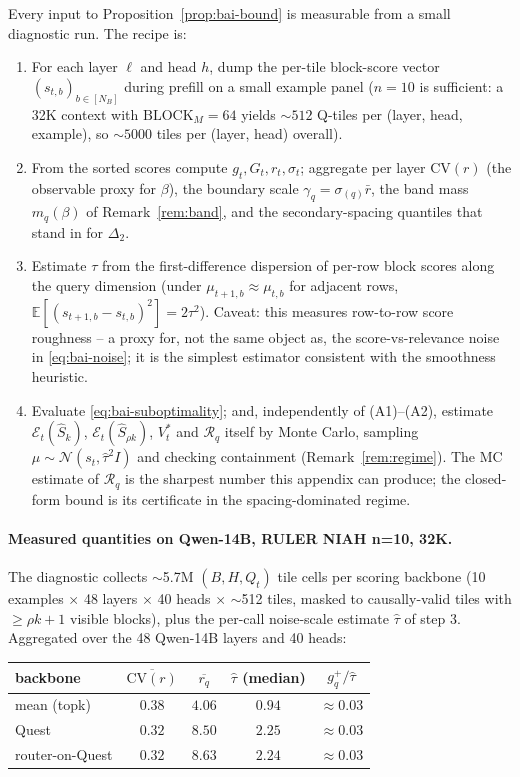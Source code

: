 \documentclass[11pt]{article}
\theoremstyle{remark}
\newcommand{\NB}{N_{\!B}}
\newcommand{\BlockM}{\text{BLOCK}_M}
\begin{document}
Every input to Proposition~\ref{prop:bai-bound} is measurable from a small diagnostic run. The recipe is:
\begin{enumerate}[leftmargin=*,topsep=0.2em,itemsep=0.1em]
    \item For each layer $\ell$ and head $h$, dump the per-tile block-score vector $(s_{t,b})_{b \in [\NB]}$ during prefill on a small example panel ($n=10$ is sufficient: a 32K context with $\BlockM = 64$ yields $\sim 512$ Q-tiles per (layer, head, example), so $\sim 5000$ tiles per (layer, head) overall).
    \item From the sorted scores compute $g_t, G_t, r_t, \sigma_t$; aggregate per layer $\mathrm{CV}(r)$ (the observable proxy for $\beta$), the boundary scale $\gamma_q = \sigma_{(q)} \bar r$, the band mass $m_q(\beta)$ of Remark~\ref{rem:band}, and the secondary-spacing quantiles that stand in for $\Delta_2$.
    \item Estimate $\tau$ from the first-difference dispersion of per-row block scores along the query dimension (under $\mu_{t+1,b} \approx \mu_{t,b}$ for adjacent rows, $\mathbb E[(s_{t+1,b} - s_{t,b})^2] = 2\tau^2$). Caveat: this measures row-to-row score roughness -- a proxy for, not the same object as, the score-vs-relevance noise in \eqref{eq:bai-noise}; it is the simplest estimator consistent with the smoothness heuristic.
    \item Evaluate \eqref{eq:bai-suboptimality}; and, independently of (A1)--(A2), estimate $\mathcal E_t(\widehat S_k)$, $\mathcal E_t(\widehat S_{\rho k})$, $V^*_t$ and $\mathcal R_q$ itself by Monte Carlo, sampling $\mu \sim \mathcal N(s_t, \hat\tau^2 I)$ and checking containment (Remark~\ref{rem:regime}). The MC estimate of $\mathcal R_q$ is the sharpest number this appendix can produce; the closed-form bound is its certificate in the spacing-dominated regime.
\end{enumerate}

\paragraph{Measured quantities on Qwen-14B, RULER NIAH n=10, 32K.} The diagnostic collects $\sim$5.7M $(B, H, Q_t)$ tile cells per scoring backbone (10 examples $\times$ 48 layers $\times$ 40 heads $\times$ $\sim$512 tiles, masked to causally-valid tiles with $\ge \rho k + 1$ visible blocks), plus the per-call noise-scale estimate $\hat\tau$ of step 3. Aggregated over the 48 Qwen-14B layers and 40 heads:

\begin{center}
\begin{tabular}{lcccc}
\toprule
backbone & $\overline{\mathrm{CV}(r)}$ & $\overline{r_q}$ & $\hat\tau$ (median) & $g_q^+/\hat\tau$ \\
\midrule
mean (topk)       & $0.38$ & $4.06$ & $0.94$ & $\approx 0.03$ \\
Quest             & $0.32$ & $8.50$ & $2.25$ & $\approx 0.03$ \\
router-on-Quest   & $0.32$ & $8.63$ & $2.24$ & $\approx 0.03$ \\
\bottomrule
\end{tabular}
\end{center}
\end{document}
